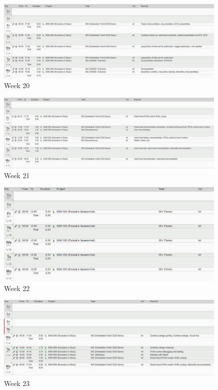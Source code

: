 \begin{figure}[!htb]
	\centering
		\includegraphics[width=\textwidth]{timetable/week20.png}
		\caption{Week 20}
\end{figure}

\begin{figure}[!htb]
	\centering
		\includegraphics[width=\textwidth]{timetable/week21.png}
		\caption{Week 21}
\end{figure}

\begin{figure}[!htb]
	\centering
		\includegraphics[width=\textwidth]{timetable/week22.png}
		\caption{Week 22}
\end{figure}

\begin{figure}[!htb]
	\centering
		\includegraphics[width=\textwidth]{timetable/week23.png}
		\caption{Week 23}
\end{figure}

